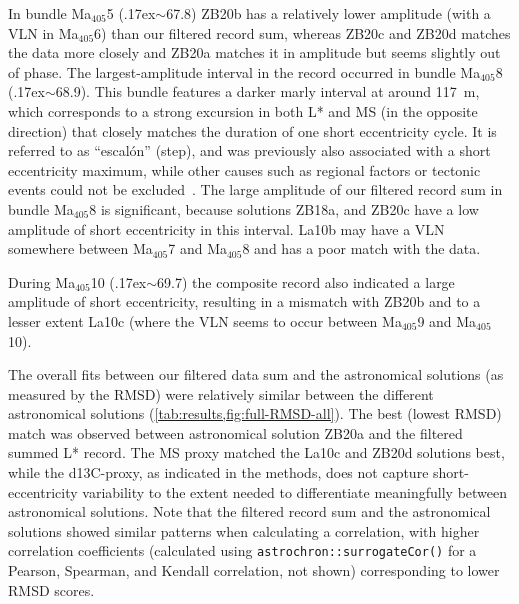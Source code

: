 \documentclass[draft]{agujournal2019}
\newcommand{\appr}{\raise.17ex\hbox{\(\scriptstyle\sim\)}} %
\newcommand{\ma}[1]{Ma\(_{405}\)#1} %
\begin{document}
In bundle \ma{5} (\appr\qty{67.8}{\millionyearago}) ZB20b has a relatively lower amplitude (with a \gls{VLN} in \ma{6}) than our filtered record sum, whereas ZB20c and ZB20d matches the data more closely and ZB20a matches it in amplitude but seems slightly out of phase.
The largest-amplitude interval in the record occurred in bundle \ma{8} (\appr\qty{68.9}{\millionyearago}).
This bundle features a darker marly interval at around \qty{117}{\metre}, which corresponds to a strong excursion in both \gls{L*} and \gls{MS} (in the opposite direction) that closely matches the duration of one short eccentricity cycle.
It is referred to as ``escal\'{o}n'' (step), and was previously also associated with a short eccentricity maximum, while other causes such as regional factors or tectonic events could not be excluded~\cite{Dinares-Turell2013}.
The large amplitude of our filtered record sum in bundle \ma{8} is significant, because solutions ZB18a, and ZB20c have a low amplitude of short eccentricity in this interval.
La10b may have a \gls{VLN} somewhere between \ma{7} and \ma{8} and has a poor match with the data.

During \ma{10} (\appr\qty{69.7}{\millionyearago}) the composite record also indicated a large amplitude of short eccentricity, resulting in a mismatch with ZB20b and to a lesser extent La10c (where the \gls{VLN} seems to occur between \ma{9} and \ma{10}).

The overall fits between our filtered data sum and the astronomical solutions (as measured by the \gls{RMSD}) were relatively similar between the different astronomical solutions (\cref{tab:results,fig:full-RMSD-all}).
The best (lowest \gls{RMSD}) match was observed between astronomical solution ZB20a and the filtered summed \gls{L*} record.
The \gls{MS} proxy matched the La10c and ZB20d solutions best, while
the \gls{d13C}-proxy, as indicated in the methods, does not capture short-eccentricity variability to the extent needed to differentiate meaningfully between astronomical solutions.
Note that the filtered record sum and the astronomical solutions showed similar patterns when calculating a correlation, with higher correlation coefficients (calculated using \texttt{astrochron::surrogateCor()} for a Pearson, Spearman, and Kendall correlation, not shown) corresponding to lower \gls{RMSD} scores.
\end{document}
